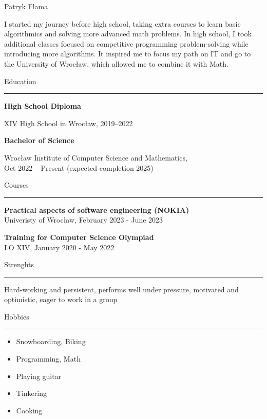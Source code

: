 \documentclass{letter}
\begin{document}
\hfill
\begin{minipage}[t]{0.60\textwidth}
\setlength{\baselineskip}{1.5\baselineskip}
\vspace{0.8cm}
{\huge Patryk Flama}

\vspace{0.3cm}

\begin{spacing}{1.125}
\small 
I started my journey before high school, taking extra courses to learn basic algorithmics and solving more advanced math problems. In high school, I took additional classes focused on competitive programming problem-solving while introducing more algorithms. It inspired me to focus my path on IT and go to the University of Wrocław, which allowed me to combine it with Math.
\end{spacing}

\vspace{0.3cm}

{\large Education}
\rule{\linewidth}{0.4pt}

{\large \textbf{High School Diploma}}

{\small XIV High School in Wrocław, 2019--2022}

{\large \textbf{Bachelor of Science}}

{\small Wrocław Institute of Computer Science and Mathematics, \\
Oct 2022 -- Present (expected completion 2025)}

\vspace{0.3cm}

{\large Courses}
\rule{\linewidth}{0.4pt}

\textbf{Practical aspects of software engineering (NOKIA)} \\
{\small Univeristy of Wrocław, February 2023 - June 2023}

\textbf{Training for Computer Science Olympiad} \\
{\small  LO XIV, January 2020 - May 2022}

\vspace{0.3cm}

{\large Strenghts}
\rule{\linewidth}{0.4pt}
Hard-working and persistent, performs well under pressure, motivated and optimistic, eager to work in a group

\vspace{0.3cm}

{\large Hobbies}
\rule{\linewidth}{0.4pt}

\begin{itemize}
\itemsep0em 
    \item Snowboarding, Biking
    \item Programming, Math
    \item Playing guitar
    \item Tinkering
    \item Cooking
\end{itemize}


\end{minipage}
\end{document}
